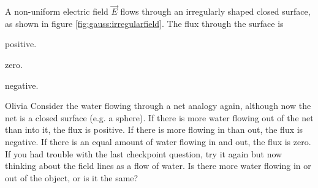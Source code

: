 \begin{checkpoint}\label{cp:gauss:unitsofflux}
\begin{MCquestion}{A non-uniform electric field $\vec E$ flows through an irregularly shaped closed surface, as shown in figure \ref{fig:gauss:irregularfield}. The flux through the surface is}
 \item positive.
 \item zero. \correct
\item negative.
\end{MCquestion}
\end{checkpoint}
\begin{studentOpinion}{Olivia}
Consider the water flowing through a net analogy again, although now the net is a closed surface (e.g. a sphere). If there is more water flowing out of the net than into it, the flux is positive. If there is more flowing in than out, the flux is negative. If there is an equal amount of water flowing in and out, the flux is zero. If you had trouble with the last checkpoint question, try it again but now thinking about the field lines as a flow of water. Is there more water flowing in or out of the object, or is it the same?
\end{studentOpinion}

